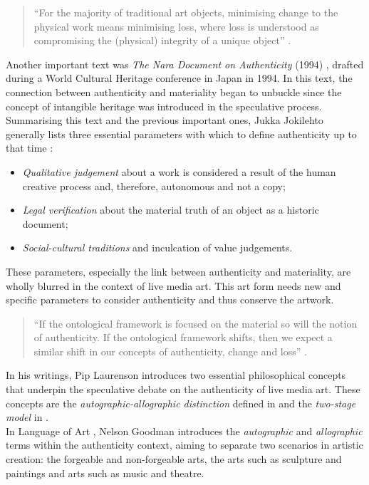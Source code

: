 \begin{quote}
    “For the majority of traditional art objects, minimising change to the physical work means minimising loss, where loss is understood as compromising the (physical) integrity of a unique object” \cite{laurenson2006authenticity}.
\end{quote}
Another important text was \textit{The Nara Document on Authenticity} (1994) \cite{naradocument1994}, drafted during a World Cultural Heritage conference in Japan in 1994. In this text, the connection between authenticity and materiality began to unbuckle since the concept of intangible heritage was introduced in the speculative process.\\
Summarising this text and the previous important ones, Jukka Jokilehto generally lists three essential parameters with which to define authenticity up to that time \cite{jokilehto2010conservation}:
\begin{itemize}
    \item \textit{Qualitative judgement} about a work is considered a result of the human creative process and, therefore, autonomous and not a copy;
    \item \textit{Legal verification} about the material truth of an object as a historic document;
    \item \textit{Social-cultural traditions} and inculcation of value judgements.
\end{itemize}
These parameters, especially the link between authenticity and materiality, are wholly blurred in the context of live media art. This art form needs new and specific parameters to consider authenticity and thus conserve the artwork.\\
\begin{quote}
    “If the ontological framework is focused on the material so will the notion of authenticity. If the ontological framework shifts, then we expect a similar shift in our concepts of authenticity, change and loss” \cite{laurenson2006authenticity}.
\end{quote}
In his writings, Pip Laurenson \cite{laurenson2004management, laurenson2006authenticity} introduces two essential philosophical concepts that underpin the speculative debate on the authenticity of live media art. These concepts are the \textit{autographic-allographic distinction} defined in \cite{goodman1968languages} and the \textit{two-stage model} in \cite{davies2001musical}.\\
In Language of Art \cite{goodman1968languages}, Nelson Goodman introduces the \textit{autographic} and \textit{allographic} terms within the authenticity context, aiming to separate two scenarios in artistic creation: the forgeable and non-forgeable arts, the arts such as sculpture and paintings and arts such as music and theatre.
